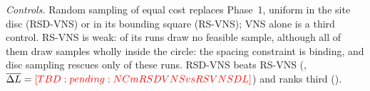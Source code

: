 \emph{Controls.} Random sampling of equal cost replaces Phase~1, uniform in the site disc (RSD-VNS) or in its bounding square (RS-VNS); VNS alone is a third control. RS-VNS is weak: \NRSRunsNoFeasSample{} of its runs draw no feasible sample, although all of them draw samples wholly inside the circle: the spacing constraint is binding, and disc sampling rescues only \NRsSquareExplains{} of these runs. RSD-VNS beats RS-VNS (\NAblRSDVNSvsRSVNS, $\overline{\Delta L}=\NCmRSDVNSvsRSVNSDL$) and ranks third (\NRankRSDVNS).

